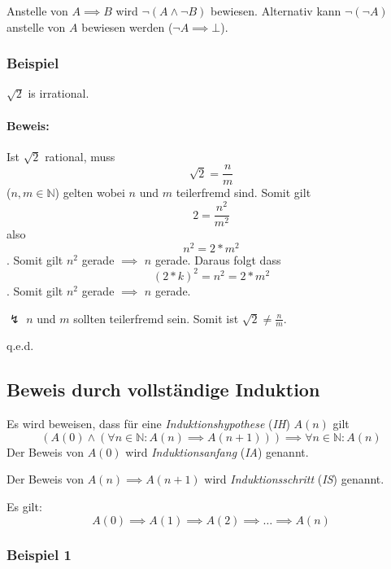 \documentclass[12pt]{scrreprt}
\newcommand{\qed}{\begin{flushright}q.e.d.\end{flushright}}
\begin{document}
                Anstelle von $ A \implies B $ wird $ \lnot (A \land \lnot B) $ bewiesen. Alternativ kann $ \lnot (\lnot A) $ anstelle von $ A $ bewiesen werden ($ \lnot A \implies \bot $).

                \subsubsection{Beispiel}

                    $ \sqrt{2} $ is irrational.

                    \paragraph{Beweis:}

                        Ist $ \sqrt{2} $ rational, muss \[ \sqrt{2} = \frac{n}{m} \] ($ n, m \in \mathbb{N} $) gelten wobei $ n $ und $ m $ teilerfremd sind. Somit gilt \[ 2 = \frac{n ^ 2}{m ^ 2} \] also \[ n ^ 2 = 2 * m ^ 2 \]. Somit gilt $ n ^ 2 $ gerade $ \implies $ $ n $ gerade. Daraus folgt dass \[ (2 * k) ^ 2 = n ^ 2 = 2 * m ^ 2 \]. Somit gilt $ n ^ 2 $ gerade $ \implies $ $ n $ gerade.

                        $ \lightning $ $ n $ und $ m $ sollten teilerfremd sein. Somit ist $ \sqrt{2} \neq \frac{n}{m} $.

                        \qed


            \subsection{Beweis durch vollständige Induktion}
                \label{ss:grundbegriffe_beweise_induktion}

                Es wird beweisen, dass für eine \textit{Induktionshypothese} (\textit{IH}) $ A(n) $ gilt \[ (A(0) \land (\forall n \in \mathbb{N} : A(n) \implies A(n + 1))) \implies \forall n \in \mathbb{N} : A(n) \]
                Der Beweis von $ A(0) $ wird \textit{Induktionsanfang} (\textit{IA}) genannt.

                Der Beweis von $ A(n) \implies A(n + 1) $ wird \textit{Induktionsschritt} (\textit{IS}) genannt.

                Es gilt: \[ A(0) \implies A(1) \implies A(2) \implies \dots \implies A(n) \]

                \subsubsection{Beispiel 1}
\end{document}
